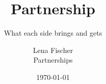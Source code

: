 \documentclass[aspectratio=169,11pt]{beamer}
\title{Partnership}
\subtitle{What each side brings and gets}
\author{Lena Fischer \\ \small Partnerships}
\date{\today}
\begin{document}
\titleslide





\end{document}

